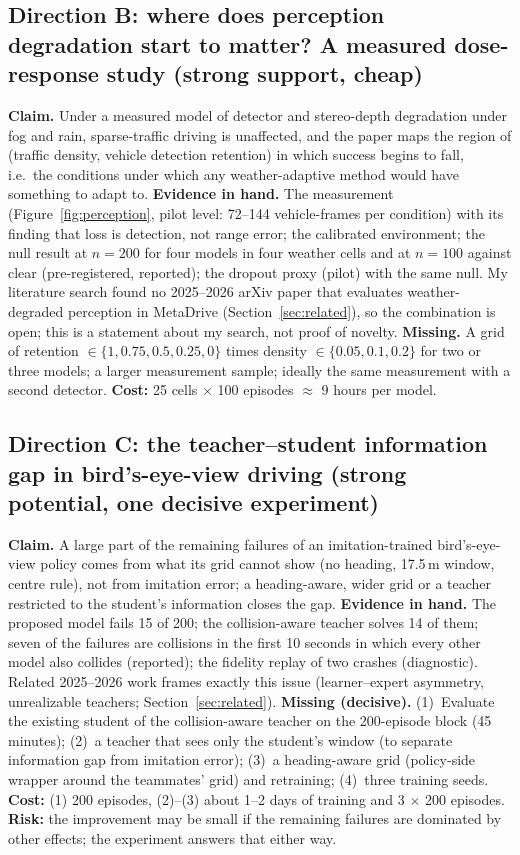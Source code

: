 \subsection{Direction B: where does perception degradation start to matter? A measured dose-response study (strong support, cheap)}
\textbf{Claim.} Under a measured model of detector and stereo-depth degradation under fog and rain, sparse-traffic driving is unaffected, and the paper maps the region of (traffic density, vehicle detection retention) in which success begins to fall, i.e.\ the conditions under which any weather-adaptive method would have something to adapt to.
\textbf{Evidence in hand.} The measurement (Figure~\ref{fig:perception}, pilot level: 72--144 vehicle-frames per condition) with its finding that loss is detection, not range error; the calibrated environment; the null result at $n=200$ for four models in four weather cells and at $n=100$ against clear (pre-registered, reported); the dropout proxy (pilot) with the same null.
My literature search found no 2025--2026 arXiv paper that evaluates weather-degraded perception in MetaDrive (Section~\ref{sec:related}), so the combination is open; this is a statement about my search, not proof of novelty.
\textbf{Missing.} A grid of retention $\in\{1,0.75,0.5,0.25,0\}$ times density $\in\{0.05,0.1,0.2\}$ for two or three models; a larger measurement sample; ideally the same measurement with a second detector. \textbf{Cost:} 25 cells $\times$ 100 episodes $\approx$ 9 hours per model.

\subsection{Direction C: the teacher--student information gap in bird's-eye-view driving (strong potential, one decisive experiment)}
\textbf{Claim.} A large part of the remaining failures of an imitation-trained bird's-eye-view policy comes from what its grid cannot show (no heading, 17.5\,m window, centre rule), not from imitation error; a heading-aware, wider grid or a teacher restricted to the student's information closes the gap.
\textbf{Evidence in hand.} The proposed model fails 15 of 200; the collision-aware teacher solves 14 of them; seven of the failures are collisions in the first 10 seconds in which every other model also collides (reported); the fidelity replay of two crashes (diagnostic).
Related 2025--2026 work frames exactly this issue (learner--expert asymmetry, unrealizable teachers; Section~\ref{sec:related}).
\textbf{Missing (decisive).} (1)~Evaluate the existing student of the collision-aware teacher on the 200-episode block (45 minutes); (2)~a teacher that sees only the student's window (to separate information gap from imitation error); (3)~a heading-aware grid (policy-side wrapper around the teammates' grid) and retraining; (4)~three training seeds. \textbf{Cost:} (1) 200 episodes, (2)--(3) about 1--2 days of training and 3 $\times$ 200 episodes.
\textbf{Risk:} the improvement may be small if the remaining failures are dominated by other effects; the experiment answers that either way.

